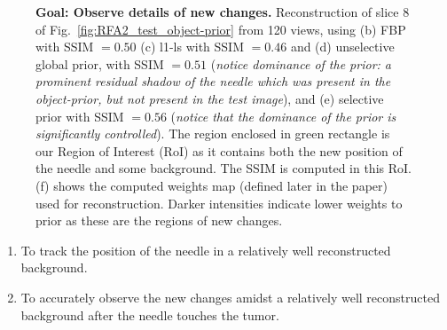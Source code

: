 \documentclass[journal]{IEEEtran}
\begin{document}
\begin{figure}[!h]
\caption[Representative results-2]{\textbf{Goal: Observe details of new changes.} Reconstruction of slice 8 of Fig.~\ref{fig:RFA2_test_object-prior} from 120 views, using (b) FBP with SSIM $= 0.50$ (c) l1-ls with SSIM $=0.46$ and (d) unselective global prior, with SSIM $=0.51$ (\emph{notice dominance of the prior: a prominent residual shadow of the needle which was present in the object-prior, but not present in the test image}), and (e) selective prior with SSIM $=0.56$ (\emph{notice that the dominance of the prior is significantly controlled}). The region enclosed in green rectangle is our Region of Interest (RoI) as it contains both the new position of the needle and some background. The SSIM is computed in this RoI. (f) shows the computed weights map (defined later in the paper) used for reconstruction. Darker intensities indicate lower weights to prior as these are the regions of new changes.}
\label{fig:RFA2_few_views}
\end{figure}

\begin{enumerate}
\item To track the position of the needle in a relatively well reconstructed background.
\item To accurately observe the new changes amidst a relatively well reconstructed background after the needle touches the tumor.
\end{enumerate} 
\end{document}

